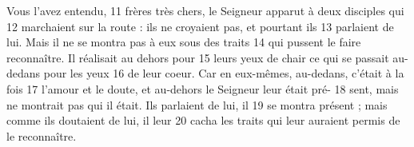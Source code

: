 Vous l'avez entendu,	 
11	 	frères très chers, le Seigneur apparut à deux disciples qui	 
12	 	marchaient sur la route : ils ne croyaient pas, et pourtant ils	 
13	 	parlaient de lui. Mais il ne se montra pas à eux sous des traits	 
14	 	qui pussent le faire reconnaître. Il réalisait au dehors pour	 
15	 	leurs yeux de chair ce qui se passait au-dedans pour les yeux	 
16	 	de leur coeur. Car en eux-mêmes, au-dedans, c'était à la fois	 
17	 	l'amour et le doute, et au-dehors le Seigneur leur était pré-	 
18	 	sent, mais ne montrait pas qui il était. Ils parlaient de lui, il	 
19	 	se montra présent ; mais comme ils doutaient de lui, il leur	 
20	 	cacha les traits qui leur auraient permis de le reconnaître.